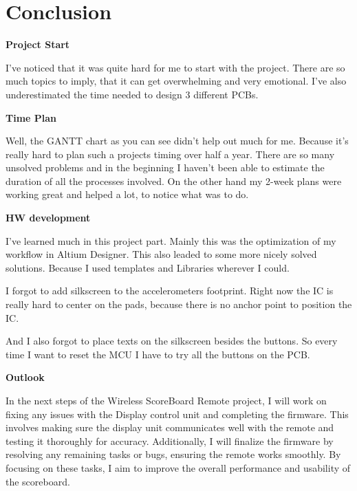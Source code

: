 \chapter{Conclusion}
\label{cha:Conclusion}


\textbf{Project Start}

I've noticed that it was quite hard for me to start with the project. There are so much topics to imply, that it can get overwhelming and very emotional. I've also underestimated the time needed to design 3 different PCBs.

\vspace{5mm}
\textbf{Time Plan}

Well, the GANTT chart as you can see didn't help out much for me. Because it's really hard to plan such a projects timing over half a year. There are so many unsolved problems and in the beginning I haven't been able to estimate the duration of all the processes involved. On the other hand my 2-week plans were working great and helped a lot, to notice what was to do.

\vspace{5mm}
\textbf{HW development}

I've learned much in this project part. Mainly this was the optimization of my workflow in Altium Designer. This also leaded to some more nicely solved solutions. Because I used templates and Libraries wherever I could.

I forgot to add silkscreen to the accelerometers footprint. Right now the IC is really hard to center on the pads, because there is no anchor point to position the IC.

And I also forgot to place texts on the silkscreen besides the buttons. So every time I want to reset the MCU I have to try all the buttons on the PCB.

\vspace{5mm}
\textbf{Outlook}

In the next steps of the Wireless ScoreBoard Remote project, I will work on fixing any issues with the Display control unit and completing the firmware. This involves making sure the display unit communicates well with the remote and testing it thoroughly for accuracy. Additionally, I will finalize the firmware by resolving any remaining tasks or bugs, ensuring the remote works smoothly. By focusing on these tasks, I aim to improve the overall performance and usability of the scoreboard.